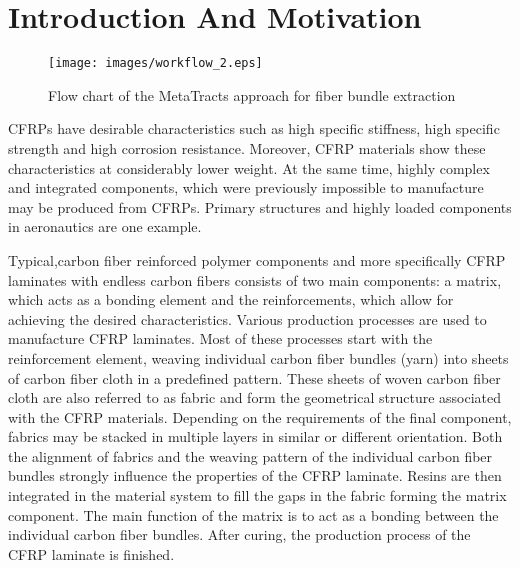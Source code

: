 \section{Introduction And Motivation}\label{sec:intro}
\begin{figure*}[tb]
	\centering
	\texttt{[image: images/workflow\_2.eps]}
	\caption{Flow chart of the MetaTracts approach for fiber bundle extraction}
	\label{fig:flowchart}
\end{figure*}
 CFRPs have desirable characteristics such as high specific stiffness, high specific strength and high corrosion resistance. Moreover, CFRP materials show these characteristics at considerably lower weight. At the same time, highly complex and integrated components, which were previously impossible to manufacture may be produced from CFRPs. Primary structures and highly loaded components in aeronautics are one example.
 
Typical,carbon fiber reinforced polymer components and more specifically CFRP laminates with endless carbon fibers consists of two main components: a matrix, which acts as a bonding element  and the reinforcements, which allow for achieving the desired characteristics. Various production processes are used to manufacture CFRP laminates. Most of these processes start with the reinforcement element, weaving individual carbon fiber bundles (yarn) into sheets of carbon fiber cloth in a predefined pattern. These sheets of woven carbon fiber cloth are also referred to as fabric and form the geometrical structure associated with the CFRP materials. Depending on the requirements of the final component, fabrics may be stacked in multiple layers in similar or different orientation. Both the  alignment of fabrics and the weaving pattern of the individual carbon fiber bundles strongly influence the properties of the CFRP laminate. Resins are then integrated in the material system to fill the gaps in the fabric forming the matrix component. The main function of the matrix is to act as a bonding between the individual carbon fiber bundles. After curing, the production process of the CFRP laminate is finished.

